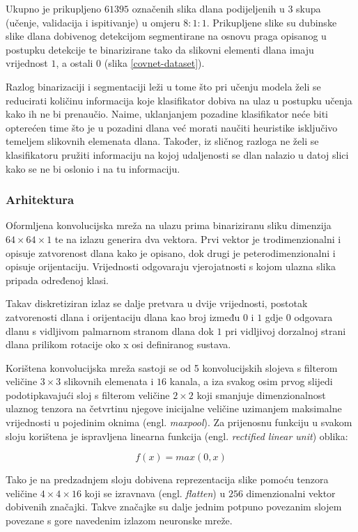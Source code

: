 \documentclass[times, utf8, diplomski, numeric]{fer}
\begin{document}
Ukupno je prikupljeno $61 395$ označenih slika dlana podijeljenih u 3 skupa (učenje, validacija i ispitivanje) u omjeru $8:1:1$. Prikupljene slike su dubinske slike dlana dobivenog detekcijom segmentirane na osnovu praga opisanog u postupku detekcije te binarizirane tako da slikovni elementi dlana imaju vrijednost $1$, a ostali $0$ (slika \ref{covnet-dataset}).

Razlog binarizaciji i segmentaciji leži u tome što pri učenju modela želi se reducirati količinu informacija koje klasifikator dobiva na ulaz u postupku učenja kako ih ne bi prenaučio. Naime, uklanjanjem pozadine klasifikator neće biti opterećen time što je u pozadini dlana već morati naučiti heuristike isključivo temeljem slikovnih elemenata dlana. Također, iz sličnog razloga ne želi se klasifikatoru pružiti informaciju na kojoj udaljenosti se dlan nalazio u datoj slici kako se ne bi oslonio i na tu informaciju.


\subsubsection{Arhitektura}\label{arhitektura-mreze}
Oformljena konvolucijska mreža na ulazu prima binariziranu sliku dimenzija $64\times64\times1$ te na izlazu generira dva vektora. Prvi vektor je trodimenzionalni i opisuje zatvorenost dlana kako je opisano, dok drugi je peterodimenzionalni i opisuje orijentaciju. Vrijednosti odgovaraju vjerojatnosti s kojom ulazna slika pripada određenoj klasi. 

Takav diskretiziran izlaz se dalje pretvara u dvije vrijednosti, postotak zatvorenosti dlana i orijentaciju dlana kao broj između $0$ i $1$ gdje $0$ odgovara dlanu s vidljivom palmarnom stranom dlana dok $1$ pri vidljivoj dorzalnoj strani dlana prilikom rotacije oko x osi definiranog sustava.

Korištena konvolucijska mreža sastoji se od 5 konvolucijskih slojeva s filterom veličine $3\times3$ slikovnih elemenata i $16$ kanala, a iza svakog osim prvog slijedi podotipkavajući sloj s filterom veličine $2\times2$ koji smanjuje dimenzionalnost ulaznog tenzora na četvrtinu njegove inicijalne veličine uzimanjem maksimalne vrijednosti u pojedinim oknima (engl. \textit{maxpool}). Za prijenosnu funkciju u svakom sloju korištena je ispravljena linearna funkcija (engl. \textit{rectified linear unit}) oblika:

$$f(x) = max(0,x)$$

Tako je na predzadnjem sloju dobivena reprezentacija slike pomoću tenzora veličine $4\times4\times16$ koji se izravnava (engl. \textit{flatten}) u $256$ dimenzionalni vektor dobivenih značajki. Takve značajke su dalje jednim potpuno povezanim slojem povezane s gore navedenim izlazom neuronske mreže.
\end{document}
